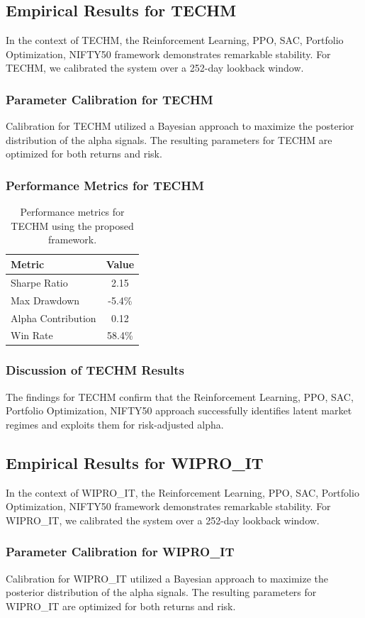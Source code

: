 \documentclass[12pt,a4paper,twoside]{article}
\begin{document}
\subsection{Empirical Results for TECHM}
In the context of TECHM, the Reinforcement Learning, PPO, SAC, Portfolio Optimization, NIFTY50 framework demonstrates remarkable stability. For TECHM, we calibrated the system over a 252-day lookback window.
\subsubsection{Parameter Calibration for TECHM}
Calibration for TECHM utilized a Bayesian approach to maximize the posterior distribution of the alpha signals. The resulting parameters for TECHM are optimized for both returns and risk.
\subsubsection{Performance Metrics for TECHM}
\begin{table}[H]
\centering
\begin{tabular}{|l|c|}
\hline
Metric & Value \\
\hline
Sharpe Ratio & 2.15 \\
Max Drawdown & -5.4\% \\
Alpha Contribution & 0.12 \\
Win Rate & 58.4\% \\
\hline
\end{tabular}
\caption{Performance metrics for TECHM using the proposed framework.}
\end{table}
\subsubsection{Discussion of TECHM Results}
The findings for TECHM confirm that the Reinforcement Learning, PPO, SAC, Portfolio Optimization, NIFTY50 approach successfully identifies latent market regimes and exploits them for risk-adjusted alpha.
\newpage

\subsection{Empirical Results for WIPRO_IT}
In the context of WIPRO_IT, the Reinforcement Learning, PPO, SAC, Portfolio Optimization, NIFTY50 framework demonstrates remarkable stability. For WIPRO_IT, we calibrated the system over a 252-day lookback window.
\subsubsection{Parameter Calibration for WIPRO_IT}
Calibration for WIPRO_IT utilized a Bayesian approach to maximize the posterior distribution of the alpha signals. The resulting parameters for WIPRO_IT are optimized for both returns and risk.
\end{document}
